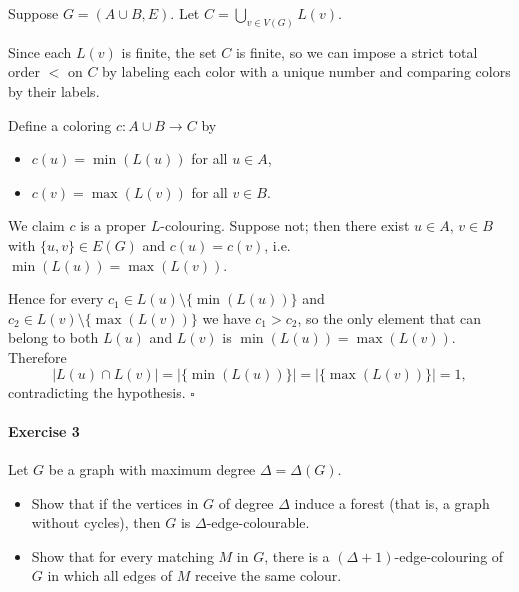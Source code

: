 \documentclass[a4paper,12pt]{article}
\newcommand{\card}[1]{\left| #1 \right|}
\begin{document}
Suppose $G = (A \cup B, E)$. Let $C = \bigcup_{v \in V(G)} L(v)$.

Since each $L(v)$ is finite, the set $C$ is finite, so we can impose a strict total order $<$ on $C$ by labeling each color with a unique number and comparing colors by their labels.

Define a coloring $c \colon A \cup B \to C$ by
\begin{itemize}
    \item $c(u) = \min(L(u))$ \quad for all $u \in A$,
    \item $c(v) = \max(L(v))$ \quad for all $v \in B$.
\end{itemize}

We claim $c$ is a proper $L$-colouring. Suppose not; then there exist $u \in A$, $v \in B$ with $\{u, v\} \in E(G)$ and $c(u) = c(v)$, i.e.\ $\min(L(u)) = \max(L(v))$.

Hence for every $c_1 \in L(u) \setminus \{\min(L(u))\}$ and $c_2 \in L(v) \setminus \{\max(L(v))\}$ we have $c_1 > c_2$, so the only element that can belong to both $L(u)$ and $L(v)$ is $\min(L(u)) = \max(L(v))$. Therefore
\[
\card{L(u) \cap L(v)} = \card{\{\min(L(u))\}} = \card{\{\max(L(v))\}} = 1,
\]
contradicting the hypothesis. \hfill$\square$

\paragraph{Exercise 3}  Let $G$ be a graph with maximum degree $\Delta = \Delta(G)$.
\begin{itemize}
	\item[(a)] Show that if the vertices in $G$ of degree $\Delta$ induce a forest (that is, a graph without cycles), then $G$ is $\Delta$-edge-colourable.
	\item[(b)] Show that for every matching $M$ in $G$, there is a $(\Delta + 1)$-edge-colouring of $G$ in which all edges of $M$ receive the same colour.
\end{itemize}
\end{document}
